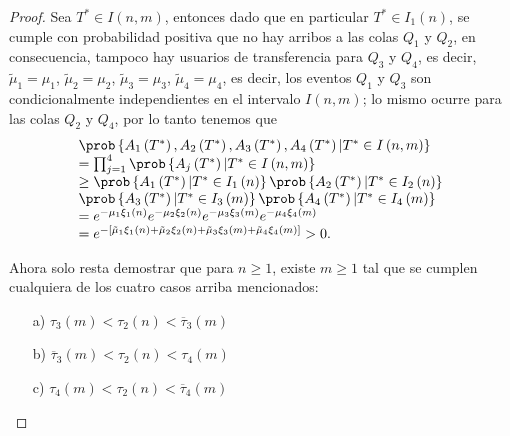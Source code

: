 \begin{proof}
Sea $T^{*}\in I\left(n,m\right)$, entonces dado que en particular $T^{*}\in I_{1}\left(n\right)$, se cumple con probabilidad positiva que no hay arribos a las colas $Q_{1}$ y $Q_{2}$, en consecuencia, tampoco hay usuarios de transferencia para $Q_{3}$ y $Q_{4}$, es decir, $\tilde{\mu}_{1}=\mu_{1}$, $\tilde{\mu}_{2}=\mu_{2}$, $\tilde{\mu}_{3}=\mu_{3}$, $\tilde{\mu}_{4}=\mu_{4}$, es decir, los eventos $Q_{1}$ y $Q_{3}$ son condicionalmente independientes en el intervalo $I\left(n,m\right)$; lo mismo ocurre para las colas $Q_{2}$ y $Q_{4}$, por lo tanto tenemos que
\begin{eqnarray}
\begin{array}{l}
\prob\left\{A_{1}\left(T^{*}\right),A_{2}\left(T^{*}\right),
A_{3}\left(T^{*}\right),A_{4}\left(T^{*}\right)|T^{*}\in I\left(n,m\right)\right\}\\
=\prod_{j=1}^{4}\prob\left\{A_{j}\left(T^{*}\right)|T^{*}\in I\left(n,m\right)\right\}\\
\geq\prob\left\{A_{1}\left(T^{*}\right)|T^{*}\in I_{1}\left(n\right)\right\}
\prob\left\{A_{2}\left(T^{*}\right)|T^{*}\in I_{2}\left(n\right)\right\}\\
\prob\left\{A_{3}\left(T^{*}\right)|T^{*}\in I_{3}\left(m\right)\right\}
\prob\left\{A_{4}\left(T^{*}\right)|T^{*}\in I_{4}\left(m\right)\right\}\\
=e^{-\mu_{1}\xi_{1}\left(n\right)}
e^{-\mu_{2}\xi_{2}\left(n\right)}
e^{-\mu_{3}\xi_{3}\left(m\right)}
e^{-\mu_{4}\xi_{4}\left(m\right)}\\
=e^{-\left[\tilde{\mu}_{1}\xi_{1}\left(n\right)
+\tilde{\mu}_{2}\xi_{2}\left(n\right)
+\tilde{\mu}_{3}\xi_{3}\left(m\right)
+\tilde{\mu}_{4}\xi_{4}
\left(m\right)\right]}>0.
\end{array}
\end{eqnarray}


Ahora solo resta demostrar que para $n\ge1$, existe $m\geq1$ tal que se cumplen cualquiera de los cuatro casos arriba mencionados: 

\begin{itemize}
\item[a)] $\tau_{3}\left(m\right)<\tau_{2}\left(n\right)<\overline{\tau}_{3}\left(m\right)$

\item[b)] $\overline{\tau}_{3}\left(m\right)<\tau_{2}\left(n\right)
<\tau_{4}\left(m\right)$

\item[c)] $\tau_{4}\left(m\right)<\tau_{2}\left(n\right)<
\overline{\tau}_{4}\left(m\right)$


\end{itemize}
\end{proof}

